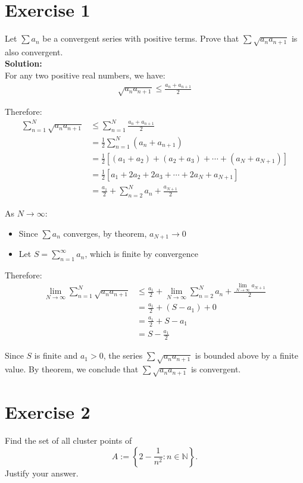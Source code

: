 \documentclass{article}
\begin{document}
\section*{Exercise 1}
Let $\sum a_n$ be a convergent series with positive terms. Prove that $\sum \sqrt{a_n a_{n+1}}$ is also convergent. \\

\textbf{Solution: } \\

For any two positive real numbers, we have:
\begin{align*}
\sqrt{a_n a_{n+1}} \leq \frac{a_n + a_{n+1}}{2}
\end{align*}

Therefore:
\begin{align*}
\sum_{n=1}^{N} \sqrt{a_n a_{n+1}} &\leq \sum_{n=1}^{N} \frac{a_n + a_{n+1}}{2} \\ 
&= \frac{1}{2}\sum_{n=1}^{N}(a_n + a_{n+1}) \\
&= \frac{1}{2}\left[(a_1 + a_2) + (a_2 + a_3) + \cdots + (a_N + a_{N+1})\right]\\
&= \frac{1}{2}\left[a_1 + 2a_2 + 2a_3 + \cdots + 2a_N + a_{N+1}\right]\\
&= \frac{a_1}{2} + \sum_{n=2}^{N}a_n + \frac{a_{N+1}}{2}
\end{align*}

As $N \to \infty$:
\begin{itemize}
    \item Since $\sum a_n$ converges, by theorem, $a_{N+1} \to 0$
    \item Let $S = \sum_{n=1}^{\infty}a_n$, which is finite by convergence
\end{itemize}

Therefore:
\begin{align*}
\lim_{N \to \infty}\sum_{n=1}^{N} \sqrt{a_n a_{n+1}} &\leq \frac{a_1}{2} + \lim_{N \to \infty}\sum_{n=2}^{N}a_n + \frac{\lim_{N \to \infty}a_{N+1}}{2}\\
&= \frac{a_1}{2} + (S - a_1) + 0\\
&= \frac{a_1}{2} + S - a_1\\
&= S - \frac{a_1}{2}
\end{align*}

Since $S$ is finite and $a_1 > 0$, the series $\sum \sqrt{a_n a_{n+1}}$ is bounded above by a finite value. By theorem, we conclude that $\sum \sqrt{a_n a_{n+1}}$ is convergent.

\newpage

\section*{Exercise 2}
Find the set of all cluster points of 
$$A := \left\{2 - \frac{1}{n^2} : n \in \mathbb{N}\right\}.$$
Justify your answer. \\
\end{document}
